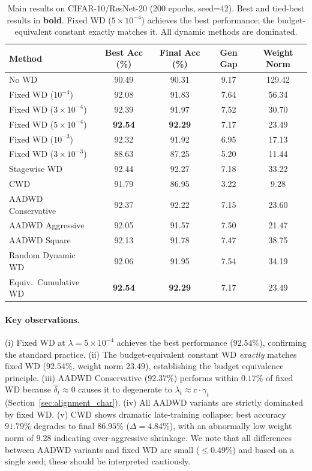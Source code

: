 \documentclass{article}
\begin{document}
\begin{table}[t]
  \centering
  \caption{Main results on CIFAR-10/ResNet-20 (200 epochs, seed=42).
           Best and tied-best results in \textbf{bold}.
           Fixed WD ($5 \times 10^{-4}$) achieves the best performance; the
           budget-equivalent constant exactly matches it.
           All dynamic methods are dominated.}
  \label{tab:main}
  \small
  \begin{tabular}{lcccc}
    \toprule
    \textbf{Method} & \textbf{Best Acc (\%)} & \textbf{Final Acc (\%)}
                    & \textbf{Gen Gap} & \textbf{Weight Norm} \\
    \midrule
    No WD & 90.49 & 90.31 & 9.17 & 129.42 \\
    Fixed WD ($10^{-4}$) & 92.08 & 91.83 & 7.64 & 56.34 \\
    Fixed WD ($3 \times 10^{-4}$) & 92.39 & 91.97 & 7.52 & 30.70 \\
    Fixed WD ($5 \times 10^{-4}$) & \textbf{92.54} & \textbf{92.29} & 7.17 & 23.49 \\
    Fixed WD ($10^{-3}$) & 92.32 & 91.92 & 6.95 & 17.13 \\
    Fixed WD ($3 \times 10^{-3}$) & 88.63 & 87.25 & 5.20 & 11.44 \\
    \midrule
    Stagewise WD & 92.44 & 92.27 & 7.18 & 33.22 \\
    CWD \citep{liu2025cautious} & 91.79 & 86.95 & 3.22 & 9.28 \\
    \midrule
    AADWD Conservative & 92.37 & 92.22 & 7.15 & 23.60 \\
    AADWD Aggressive & 92.05 & 91.57 & 7.50 & 21.47 \\
    AADWD Square & 92.13 & 91.78 & 7.47 & 38.75 \\
    \midrule
    Random Dynamic WD & 92.06 & 91.95 & 7.54 & 34.19 \\
    Equiv.\ Cumulative WD & \textbf{92.54} & \textbf{92.29} & 7.17 & 23.49 \\
    \bottomrule
  \end{tabular}
\end{table}

\paragraph{Key observations.}
(i) Fixed WD at $\lambda = 5 \times 10^{-4}$ achieves the best performance
($92.54\%$), confirming the standard practice.
(ii) The budget-equivalent constant WD \emph{exactly} matches fixed WD ($92.54\%$,
weight norm $23.49$), establishing the budget equivalence principle.
(iii) AADWD Conservative ($92.37\%$) performs within $0.17\%$ of fixed WD because
$\hat{\delta}_t \approx 0$ causes it to degenerate to $\lambda_t \approx c \cdot
\gamma_t$ (Section~\ref{sec:alignment_char}).
(iv) All AADWD variants are strictly dominated by fixed WD.
(v) CWD shows dramatic late-training collapse: best accuracy $91.79\%$ degrades to
final $86.95\%$ ($\Delta = 4.84\%$), with an abnormally low weight norm of $9.28$
indicating over-aggressive shrinkage.
We note that all differences between AADWD variants and fixed WD are small
($\leq 0.49\%$) and based on a single seed; these should be interpreted cautiously.
\end{document}
